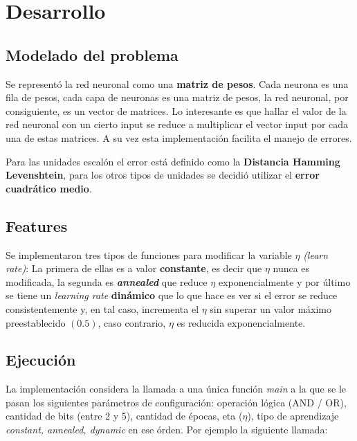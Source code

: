 \documentclass[%
    final,
    reprint,
    notitlepage,
    narroweqnarray,
    inline,
    twoside,
    invited
    ]{ieee}
\begin{document}

\section{Desarrollo}

\subsection{Modelado del problema}

\par Se representó la red neuronal como una \textbf{matriz de pesos}. Cada neurona es una fila de pesos, cada capa de neuronas es una matriz de pesos, la red neuronal, por consiguiente, es un vector de matrices. Lo interesante es que hallar el valor de la red neuronal con un cierto input se reduce a multiplicar el vector input por cada una de estas matrices. A su vez esta implementación facilita el manejo de errores.\\

\par Para las unidades escalón el error está definido como la \textbf{Distancia Hamming Levenshtein}, para los otros tipos de unidades se decidió utilizar el \textbf{error cuadrático medio}.

\subsection{Features}

\par Se implementaron tres tipos de funciones para modificar la variable $\eta$ \textit{(learn rate)}: La primera de ellas es a valor \textbf{constante}, es decir que $\eta$ nunca es modificada, la segunda es \textbf{\textit{annealed}} que reduce $\eta$ exponencialmente y por último se tiene un \textit{learning rate} \textbf{dinámico} que lo que hace es ver si el error se reduce consistentemente y, en tal caso, incrementa el $\eta$ sin superar un valor máximo preestablecido $(0.5)$, caso contrario, $\eta$ es reducida exponencialmente.

\subsection{Ejecución}

\par La implementación considera la llamada a una única función \textit{main} a la que se le pasan los siguientes parámetros de configuración: operación lógica (AND / OR), cantidad de bits (entre 2 y 5), cantidad de épocas, eta ($\eta$), tipo de aprendizaje \textit{constant, annealed, dynamic} en ese órden.
Por ejemplo la siguiente llamada:
\end{document}
